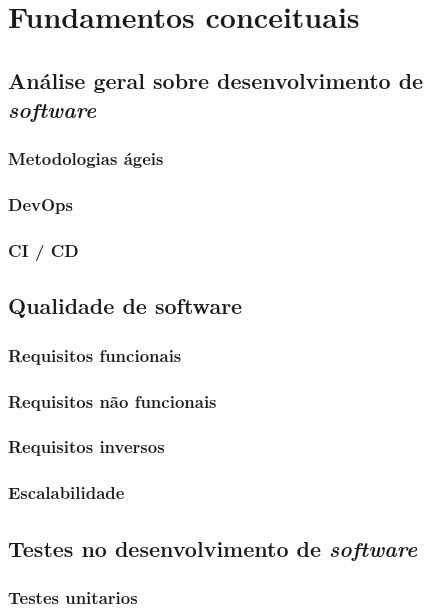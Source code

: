 \part{Fundamentos conceituais}
  \chapter{Análise geral sobre desenvolvimento de \textit{software}}

    \section{Metodologias ágeis}

    \section{DevOps}

    \section{CI / CD}

  \chapter{Qualidade de software}

    \section{Requisitos funcionais}

    \section{Requisitos não funcionais}

    \section{Requisitos inversos}

    \section{Escalabilidade}

  \chapter{Testes no desenvolvimento de \textit{software}}

    \section{Testes unitarios}

